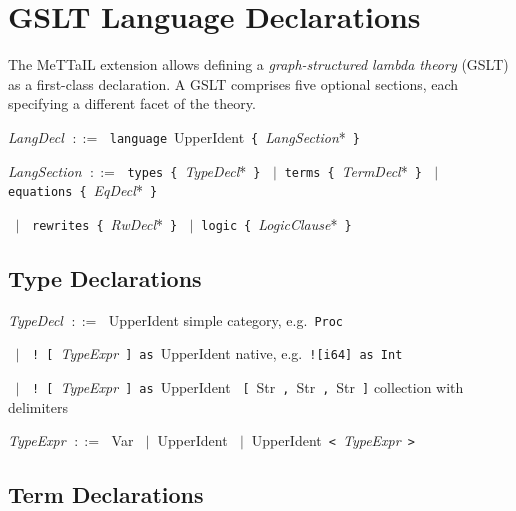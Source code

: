\documentclass[11pt,a4paper]{article}
\newcommand{\kw}[1]{\texttt{\textcolor{kw}{#1}}}       %
\newcommand{\sym}[1]{\texttt{#1}}                       %
\newcommand{\nt}[1]{\textit{\textcolor{nt}{#1}}}        %
\newcommand{\tok}[1]{\textsf{#1}}                       %
\newcommand{\OR}{\ensuremath{\;\mid\;}}                  %
\newcommand{\bnfdef}{\ensuremath{\;::=\;}}               %
\newenvironment{grammar}{%
  \par\smallskip\begin{list}{}{%
    \setlength{\leftmargin}{1.5em}%
    \setlength{\itemsep}{2pt}%
    \setlength{\parsep}{0pt}}%
}{\end{list}\smallskip}
\begin{document}
\section{GSLT Language Declarations}
\label{sec:gslt}

The MeTTaIL extension allows defining a \emph{graph-structured lambda
theory} (GSLT) as a first-class declaration.  A GSLT comprises five
optional sections, each specifying a different facet of the theory.

\begin{grammar}
\item \nt{LangDecl} \bnfdef
    \kw{language}~\tok{UpperIdent}~\sym{\{}~\nt{LangSection}*~\sym{\}}
\item \nt{LangSection} \bnfdef
    \kw{types}~\sym{\{}~\nt{TypeDecl}*~\sym{\}}
    \OR \kw{terms}~\sym{\{}~\nt{TermDecl}*~\sym{\}}
    \OR \kw{equations}~\sym{\{}~\nt{EqDecl}*~\sym{\}}
\item \phantom{\nt{LangSection}} \OR
    \kw{rewrites}~\sym{\{}~\nt{RwDecl}*~\sym{\}}
    \OR \kw{logic}~\sym{\{}~\nt{LogicClause}*~\sym{\}}
\end{grammar}

\subsection{Type Declarations}

\begin{grammar}
\item \nt{TypeDecl} \bnfdef
    \tok{UpperIdent}
    \hfill\textcolor{cmt}{simple category, e.g.\ \texttt{Proc}}
\item \phantom{\nt{TypeDecl}} \OR
    \sym{!}~\sym{[}~\nt{TypeExpr}~\sym{]}~\kw{as}~\tok{UpperIdent}
    \hfill\textcolor{cmt}{native, e.g.\ \texttt{![i64] as Int}}
\item \phantom{\nt{TypeDecl}} \OR
    \sym{!}~\sym{[}~\nt{TypeExpr}~\sym{]}~\kw{as}~\tok{UpperIdent}~%
    \sym{[}~\tok{Str}~\sym{,}~\tok{Str}~\sym{,}~\tok{Str}~\sym{]}
    \hfill\textcolor{cmt}{collection with delimiters}
\item \nt{TypeExpr} \bnfdef
    \tok{Var} \OR \tok{UpperIdent}
    \OR \tok{UpperIdent}~\sym{<}~\nt{TypeExpr}~\sym{>}
\end{grammar}

\subsection{Term Declarations}
\end{document}
